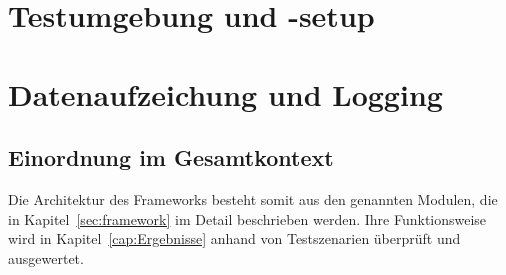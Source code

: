 







\section{Testumgebung und -setup}


\section{Datenaufzeichung und Logging}



\subsection*{Einordnung im Gesamtkontext}
Die Architektur des Frameworks besteht somit aus den genannten Modulen, die in
Kapitel~\ref{sec:framework} im Detail beschrieben werden. Ihre Funktionsweise wird in
Kapitel~\ref{cap:Ergebnisse} anhand von Testszenarien überprüft und ausgewertet.

